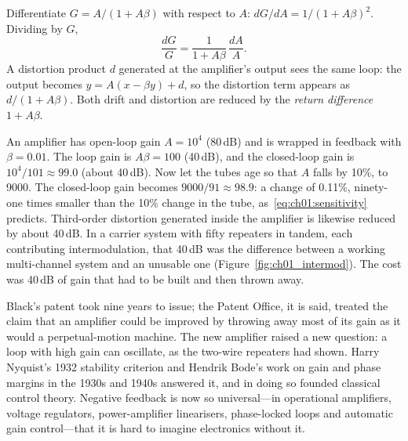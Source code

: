 \begin{deeper}
Differentiate $G=A/(1+A\beta)$ with respect to $A$:
$dG/dA = 1/(1+A\beta)^2$. Dividing by $G$,
\begin{equation}
\frac{dG}{G} = \frac{1}{1+A\beta}\,\frac{dA}{A}.
\label{eq:ch01:sensitivity}
\end{equation}
A distortion product $d$ generated at the amplifier's output sees the same loop: the output becomes
$y = A(x-\beta y) + d$, so the distortion term appears as $d/(1+A\beta)$. Both drift and distortion
are reduced by the \emph{return difference} $1+A\beta$.
\end{deeper}

\begin{worked}
An amplifier has open-loop gain $A=10^4$ (80\,dB) and is wrapped in feedback with $\beta=0.01$.
The loop gain is $A\beta=100$ (40\,dB), and the closed-loop gain is $10^4/101\approx99.0$ (about
40\,dB). Now let the tubes age so that $A$ falls by 10\%, to 9000. The closed-loop gain becomes
$9000/91\approx98.9$: a change of 0.11\%, ninety-one times smaller than the 10\% change in the tube,
as~\eqref{eq:ch01:sensitivity} predicts. Third-order distortion generated inside the amplifier is
likewise reduced by about 40\,dB. In a carrier system with fifty repeaters in tandem, each
contributing intermodulation, that 40\,dB was the difference between a working multi-channel system
and an unusable one (Figure~\ref{fig:ch01_intermod}). The cost was 40\,dB of gain that had to be
built and then thrown away.
\end{worked}


Black's patent took nine years to issue; the Patent Office, it is said, treated the claim that an
amplifier could be improved by throwing away most of its gain as it would a perpetual-motion machine.
The new amplifier raised a new question: a loop with high gain can oscillate, as the two-wire
repeaters had shown. Harry Nyquist's 1932 stability criterion and Hendrik Bode's work on gain and
phase margins in the 1930s and 1940s answered it, and in doing so founded classical control theory.
Negative feedback is now so universal---in operational amplifiers, voltage regulators, power-amplifier
linearisers, phase-locked loops and automatic gain control---that it is hard to imagine electronics
without it.

